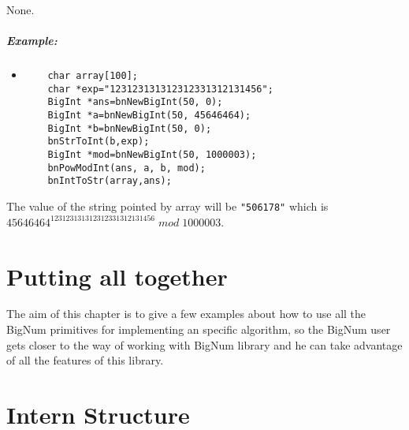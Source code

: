 \documentclass{book}
\begin{document}
None.

\paragraph{Example:}

\begin{itemize}
\item
\begin{verbatim}
    char array[100];
    char *exp="123123131312312331312131456";
    BigInt *ans=bnNewBigInt(50, 0);
    BigInt *a=bnNewBigInt(50, 45646464);
    BigInt *b=bnNewBigInt(50, 0);
    bnStrToInt(b,exp);
    BigInt *mod=bnNewBigInt(50, 1000003);
    bnPowModInt(ans, a, b, mod);
    bnIntToStr(array,ans);
\end{verbatim}
\end{itemize}

The value of the string pointed by array will be \verb+"506178"+  which is $45646464^{123123131312312331312131456}\;mod\;1000003$.

\chapter{Putting all together}

The aim of this chapter is to give a few examples about how to use all the BigNum primitives for implementing an specific algorithm, so the BigNum user gets closer to the way of working with BigNum library and he can take advantage of all the features of this library.  



\chapter{Intern Structure}
\end{document}
